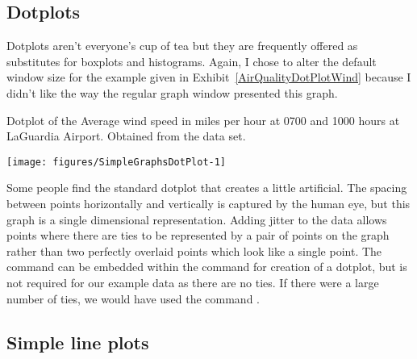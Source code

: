 \subsection{Dotplots} 
 
Dotplots aren't everyone's cup of tea but they are frequently offered as substitutes for boxplots and histograms. Again, I chose to alter the default window size for the example given in Exhibit~\ref{AirQualityDotPlotWind} 
because I didn't like the way the regular graph window presented this graph. 
\begin{exhibit} 
\begin{center} 
\caption{Dotplot of the Average wind speed in miles per hour at 0700 and 1000 hours at LaGuardia Airport. Obtained from the  data set.} 
\label{AirQualityDotPlotWind} 
\begin{Schunk}

\texttt{[image: figures/SimpleGraphsDotPlot-1]} \end{Schunk}
\end{center} 
\end{exhibit} 
 
Some people find the standard dotplot that \R{} creates a little artificial. The spacing between points horizontally and vertically is captured by the human eye, but this graph is a single dimensional representation. Adding jitter to the data allows points where there are ties to be represented by a pair of points on the graph rather than two perfectly overlaid points which look like a single point. The  command can be embedded within the command for creation of a dotplot, but is not required for our example data as there are no ties. If there were a large number of ties, we would have used the command . 
 
 
 
\subsection{Simple line plots} 
 
